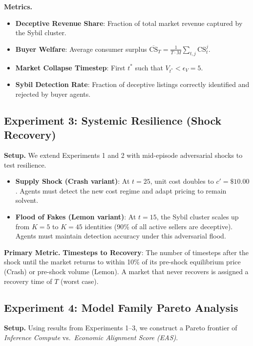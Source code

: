 \textbf{Metrics.}
\begin{itemize}
    \item \textbf{Deceptive Revenue Share}: Fraction of total market revenue captured by the Sybil cluster.
    \item \textbf{Buyer Welfare}: Average consumer surplus $\overline{\mathrm{CS}}_T = \frac{1}{T \cdot M} \sum_{t,j} \mathrm{CS}_t^j$.
    \item \textbf{Market Collapse Timestep}: First $t^*$ such that $V_{t^*} < \epsilon_V = 5$.
    \item \textbf{Sybil Detection Rate}: Fraction of deceptive listings correctly identified and rejected by buyer agents.
\end{itemize}

\subsection{Experiment 3: Systemic Resilience (Shock Recovery)}
\label{exp:resilience}

\textbf{Setup.}
We extend Experiments 1 and 2 with mid-episode adversarial shocks to test resilience.
\begin{itemize}
    \item \textbf{Supply Shock (Crash variant)}: At $t=25$, unit cost doubles to $c' = \$10.00$. Agents must detect the new cost regime and adapt pricing to remain solvent.
    \item \textbf{Flood of Fakes (Lemon variant)}: At $t=15$, the Sybil cluster scales up from $K=5$ to $K=45$ identities (90\% of all active sellers are deceptive). Agents must maintain detection accuracy under this adversarial flood.
\end{itemize}

\textbf{Primary Metric.}
\textbf{Timesteps to Recovery}: The number of timesteps after the shock until the market returns to within 10\% of its pre-shock equilibrium price (Crash) or pre-shock volume (Lemon). A market that never recovers is assigned a recovery time of $T$ (worst case).

\subsection{Experiment 4: Model Family Pareto Analysis}
\label{exp:pareto}

\textbf{Setup.}
Using results from Experiments 1--3, we construct a Pareto frontier of \textit{Inference Compute} vs.\ \textit{Economic Alignment Score (EAS)}.

